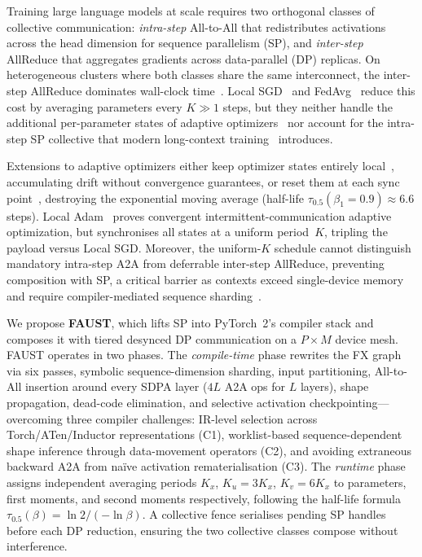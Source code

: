 \documentclass{article}
\begin{document}
Training large language models at scale requires two orthogonal classes of
collective communication: \emph{intra-step} All-to-All that redistributes
activations across the head dimension for sequence parallelism (SP), and
\emph{inter-step} AllReduce that aggregates gradients across data-parallel (DP)
replicas. On heterogeneous clusters where both classes share the same
interconnect, the inter-step AllReduce dominates wall-clock
time~\citep{li2020pytorch}. Local SGD~\citep{stich2019local} and
FedAvg~\citep{mcmahan2017communication} reduce this cost by averaging
parameters every $K \gg 1$ steps, but they neither handle the additional
per-parameter states of adaptive optimizers~\citep{kingma2017adammethodstochasticoptimization} nor
account for the intra-step SP collective that modern long-context
training~\citep{grattafiori2024llama3herdmodels} introduces.

Extensions to adaptive optimizers either keep optimizer states entirely
local~\citep{douillard2024dilocodistributedlowcommunicationtraining}, accumulating drift without convergence
guarantees, or reset them at each sync
point~\citep{sani2024futurelargelanguagemodel,sani2024photonfederatedllmpretraining}, destroying the exponential moving
average (half-life $\tau_{0.5}(\beta_1{=}0.9) \approx 6.6$ steps).
Local Adam~\citep{cheng2025convergencedistributedadaptiveoptimization} proves convergent intermittent-communication
adaptive optimization, but synchronises all states at a uniform period~$K$,
tripling the payload versus Local SGD. Moreover, the uniform-$K$ schedule cannot distinguish
mandatory intra-step A2A from deferrable inter-step AllReduce, preventing
composition with SP, a critical barrier as contexts exceed single-device memory
and require compiler-mediated sequence
sharding~\citep{jacobs2023deepspeedulyssesoptimizationsenabling,fang2024uspunifiedsequenceparallelism}.

We propose \textbf{FAUST}, which lifts SP into PyTorch~2's compiler stack and
composes it with tiered desynced DP communication on a $P \times M$ device mesh.
FAUST operates in two phases. The \emph{compile-time} phase rewrites the
FX graph via six passes, symbolic sequence-dimension sharding, input partitioning,
All-to-All insertion around every SDPA layer ($4L$ A2A ops for $L$ layers),
shape propagation, dead-code elimination, and selective activation
checkpointing---overcoming three compiler challenges: IR-level selection across
Torch/ATen/Inductor representations (C1), worklist-based sequence-dependent shape
inference through data-movement operators (C2), and avoiding extraneous backward
A2A from na\"ive activation rematerialisation (C3).
The \emph{runtime} phase assigns independent averaging periods
$K_x$, $K_u{=}3K_x$, $K_v{=}6K_x$ to parameters, first moments, and second
moments respectively, following the half-life formula
$\tau_{0.5}(\beta) = \ln 2 / ({-}\ln\beta)$.
A collective fence serialises pending SP handles before each DP reduction,
ensuring the two collective classes compose without interference.
\end{document}

